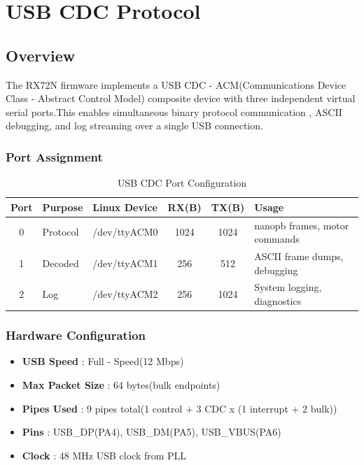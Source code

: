 \section{USB CDC Protocol}
\label {
sec:
  usb_cdc_protocol
}

\subsection{Overview}

    The RX72N firmware implements a USB CDC -
    ACM(Communications Device Class -
        Abstract Control Model) composite device with three independent
    virtual serial ports.This enables simultaneous binary protocol communication
    ,
    ASCII debugging,
    and log streaming over a single USB connection.

\subsubsection{Port Assignment
}

\begin{table}[h]
\centering
\begin{tabular}{|c|l|l|c|c|p{4cm}|}
\hline
\textbf{Port} & \textbf{Purpose} & \textbf{Linux Device} & \textbf{RX(B)} & \textbf{TX(B)} & \textbf{Usage} \\
\hline
0 & Protocol & /dev/ttyACM0 & 1024 & 1024 & nanopb frames, motor commands \\
1 & Decoded & /dev/ttyACM1 & 256 & 512 & ASCII frame dumps, debugging \\
2 & Log & /dev/ttyACM2 & 256 & 1024 & System logging, diagnostics \\
\hline
\end{tabular}
\caption { USB CDC Port Configuration}
\label {
tab:
  usb_cdc_ports
}
\end{table}

\subsubsection{Hardware Configuration}

\begin{itemize}
\item \textbf{USB Speed} : Full - Speed(12 Mbps)
\item \textbf{Max Packet Size} : 64 bytes(bulk endpoints)
\item \textbf{Pipes Used} : 9 pipes
                           total(1 control + 3 CDC x (1 interrupt + 2 bulk))
\item \textbf{Pins} : USB\_DP(PA4),
    USB\_DM(PA5), USB\_VBUS(PA6)
\item \textbf{Clock} : 48 MHz USB clock from PLL
\end{itemize}

